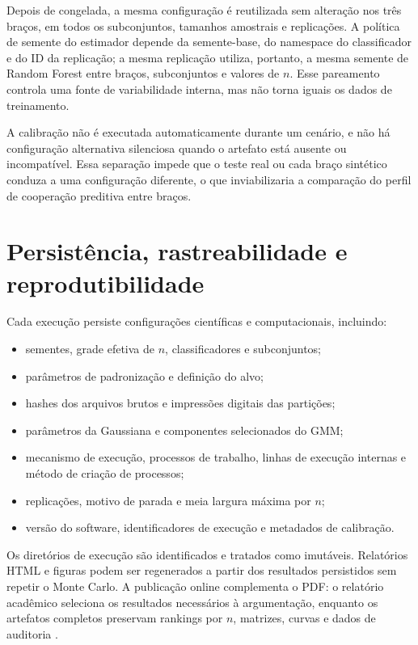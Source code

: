 Depois de congelada, a mesma configuração é reutilizada sem alteração nos três braços, em todos os subconjuntos, tamanhos amostrais e replicações. A política de semente do estimador depende da semente-base, do namespace do classificador e do ID da replicação; a mesma replicação utiliza, portanto, a mesma semente de Random Forest entre braços, subconjuntos e valores de $n$. Esse pareamento controla uma fonte de variabilidade interna, mas não torna iguais os dados de treinamento.

A calibração não é executada automaticamente durante um cenário, e não há configuração alternativa silenciosa quando o artefato está ausente ou incompatível. Essa separação impede que o teste real ou cada braço sintético conduza a uma configuração diferente, o que inviabilizaria a comparação do perfil de cooperação preditiva entre braços.

\section{Persistência, rastreabilidade e reprodutibilidade}

Cada execução persiste configurações científicas e computacionais, incluindo:

\begin{itemize}
  \item sementes, grade efetiva de $n$, classificadores e subconjuntos;
  \item parâmetros de padronização e definição do alvo;
  \item hashes dos arquivos brutos e impressões digitais das partições;
  \item parâmetros da Gaussiana e componentes selecionados do GMM;
  \item mecanismo de execução, processos de trabalho, linhas de execução internas e método de criação de processos;
  \item replicações, motivo de parada e meia largura máxima por $n$;
  \item versão do software, identificadores de execução e metadados de calibração.
\end{itemize}

Os diretórios de execução são identificados e tratados como imutáveis. Relatórios HTML e figuras podem ser regenerados a partir dos resultados persistidos sem repetir o Monte Carlo. A publicação online complementa o PDF: o relatório acadêmico seleciona os resultados necessários à argumentação, enquanto os artefatos completos preservam rankings por $n$, matrizes, curvas e dados de auditoria \cite{azevedo2026coinfosim}.
